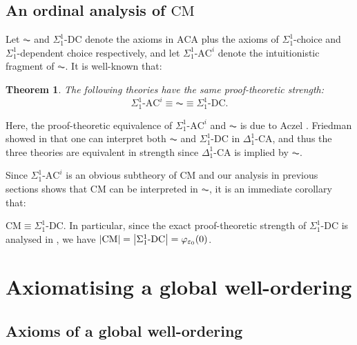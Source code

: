 \documentclass[11pt]{article}
\theoremstyle{plain}
\newtheorem{theorem}{Theorem}[section]
\theoremstyle{definition}
\begin{document}
\subsection{An ordinal analysis of \texorpdfstring{$\mathrm{CM}$}{CM}}

\newcommand{\ACi}{\text{$\Sigma^1_1$-$\mathrm{AC}^i$}}
\newcommand{\DC}{\text{$\Sigma^1_1$-$\mathrm{DC}$}}
\newcommand{\CA}{\text{$\Delta^1_1$-$\mathrm{CA}$}}

Let $\AC$ and $\DC$ denote the axioms in $\mathrm{ACA}$ plus the axioms of $\Sigma^1_1$-choice and $\Sigma^1_1$-dependent choice respectively, and let $\ACi$ denote the intuitionistic fragment of $\AC$. It is well-known that:

\begin{theorem}
    The following theories have the same proof-theoretic strength:
    \[\ACi \equiv \AC \equiv \DC.\]
\end{theorem}

Here, the proof-theoretic equivalence of $\ACi$ and $\AC$ is due to Aczel \cite{aczel77-martin-lof}. Friedman showed in \cite{friedman67-thesis} that one can interpret both $\AC$ and $\DC$ in $\CA$, and thus the three theories are equivalent in strength since $\CA$ is implied by $\AC$.

Since $\ACi$ is an obvious subtheory of $\mathrm{CM}$ and our analysis in previous sections shows that $\mathrm{CM}$ can be interpreted in $\AC$, it is an immediate corollary that:

\begin{corollary}
    $\mathrm{CM} \equiv \DC$. In particular, since the exact proof-theoretic strength of $\DC$ is analysed in \cite{friedman70-sigma11-12-ac}, we have $\left|\mathrm{CM}\right| = \left|\DC\right| = \varphi_{\varepsilon_0}\mleft(0\mright)$.
\end{corollary}

\section{Axiomatising a global well-ordering}
\label{sec:axiom-gwo}

\subsection{Axioms of a global well-ordering}
\end{document}
